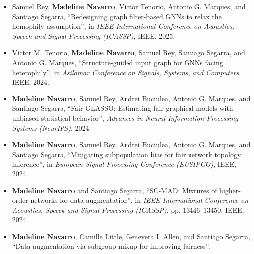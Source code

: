 \documentclass[letterpaper,10pt]{article}
\newcommand{\resumeBullet}[1]{\item[\textbullet]\small{#1}}
\newcommand{\resumeCustomBullet}[2]{\item[#1]\small{#2}}
\begin{document}
\begin{itemize}[leftmargin=0.25in, label={}]
\begin{itemize}[leftmargin=0.25in, label={}]
\begin{itemize}[leftmargin=0.35in, label={}]
{            in \textit{IEEE International Conference on Acoustics, Speech and Signal Processing (ICASSP)}, IEEE, 2025. 
          }
          \resumeCustomBullet{{[C7]~\,}}{
            Samuel Rey,
            \textbf{Madeline Navarro},
            Victor Tenorio,
            Antonio G. Marques, 
            and
            Santiago Segarra,
            ``Redesigning graph filter-based GNNs to relax the homophily assumption'',
            in \textit{IEEE International Conference on Acoustics, Speech and Signal Processing (ICASSP)}, IEEE, 2025. 
          }      
          \resumeCustomBullet{{[C8]~\,}}{
            Victor M. Tenorio,
            \textbf{Madeline Navarro},
            Samuel Rey,
            Santiago Segarra,
            and
            Antonio G. Marques, 
            ``Structure-guided input graph for GNNs facing heterophily'',
            in \textit{Asilomar Conference on Signals, Systems, and Computers},
            IEEE,
            2024.
          }
          \resumeCustomBullet{{[C9]~\,}}{
            \textbf{Madeline Navarro},
            Samuel Rey,
            Andrei Buciulea,
            Antonio G. Marques, 
            and
            Santiago Segarra,
            ``Fair GLASSO: Estimating fair graphical models with unbiased statistical behavior'',
            \textit{Advances in Neural Information Processing Systems (NeurIPS)},
            2024.
          }
          \resumeCustomBullet{{[C10]}}{
            \textbf{Madeline Navarro},
            Samuel Rey,
            Andrei Buciulea,
            Antonio G. Marques, 
            and
            Santiago Segarra,
            ``Mitigating subpopulation bias for fair network topology inference'',
            in \textit{European Signal Processing Conference (EUSIPCO)},
            IEEE,
            2024.
          }
          \resumeCustomBullet{{[C11]}}{
            \textbf{Madeline Navarro} 
            and
            Santiago Segarra,
            ``SC-MAD: Mixtures of higher-order networks for data augmentation'',
            in \textit{IEEE International Conference on Acoustics, Speech and Signal Processing (ICASSP)},
            pp. 13446--13450,
            IEEE,
            2024.
          }
          \resumeCustomBullet{{[C12]}}{
            \textbf{Madeline Navarro},
            Camille Little,
            Genevera I. Allen,
            and
            Santiago Segarra,
            ``Data augmentation via subgroup mixup for improving fairness'',
}
\end{itemize}
\end{itemize}
\end{itemize}
\end{document}
